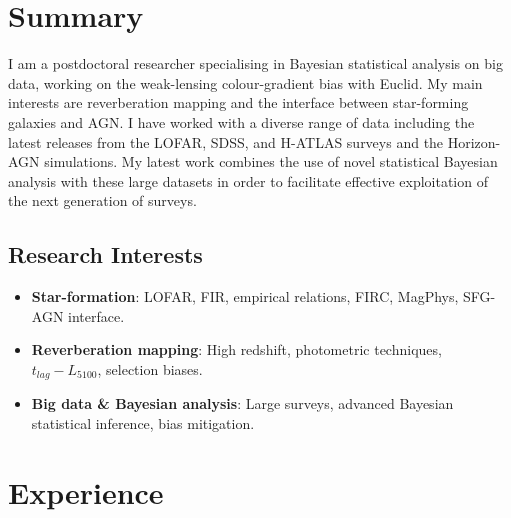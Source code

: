 \documentclass[letterpaper]{twentysecondcv} %
\begin{document}
\makeprofile %
 

\section{Summary}
     I am a postdoctoral researcher specialising in Bayesian statistical analysis on big data, working on the weak-lensing colour-gradient bias with Euclid.
My main interests are reverberation mapping and the interface between star-forming galaxies and AGN. 
I have worked with a diverse range of data including the latest releases from the LOFAR, SDSS, and H-ATLAS surveys and the Horizon-AGN simulations. 
My latest work combines the use of novel statistical Bayesian analysis with these large datasets in order to facilitate effective exploitation of the 
next generation of surveys.


\subsection{Research Interests}
\begin{itemize}
     \item \textbf{Star-formation}: LOFAR, FIR, empirical relations, FIRC, MagPhys, SFG-AGN interface.
 \item \textbf{Reverberation mapping}: High redshift, photometric techniques, $t_{lag}-L_{5100}$, selection
biases.
 \item \textbf{Big data \& Bayesian analysis}: Large surveys, advanced Bayesian statistical inference, bias mitigation.
\end{itemize}

\section{Experience}
\end{document}
